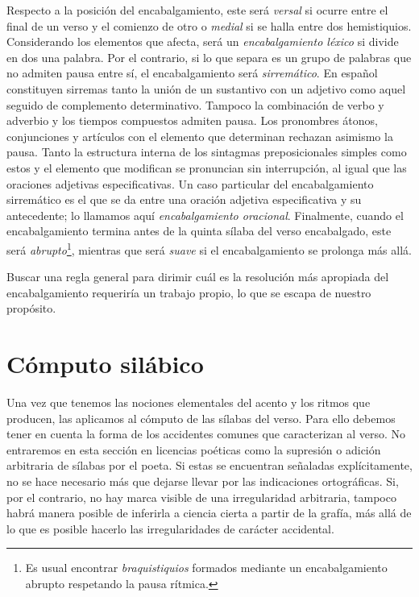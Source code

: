 Respecto a la posición del encabalgamiento, este será \textit{versal} si ocurre entre el final de un verso y el comienzo de otro o \textit{medial} si se halla entre dos hemistiquios. Considerando los elementos que afecta, será un\textit{ encabalgamiento léxico} si divide en dos una palabra. Por el contrario, si lo que separa es un grupo de palabras que no admiten pausa entre sí, el encabalgamiento será \textit{sirremático}. En español constituyen sirremas tanto la unión de un sustantivo con un adjetivo como aquel seguido de complemento determinativo. Tampoco la combinación de verbo y adverbio y los tiempos compuestos admiten pausa. Los pronombres átonos, conjunciones y artículos con el elemento que determinan rechazan asimismo la pausa. Tanto la estructura interna de los sintagmas preposicionales simples como estos y el elemento que modifican se pronuncian sin interrupción, al igual que las  oraciones adjetivas especificativas.  Un caso particular del encabalgamiento sirremático es el que se da entre una oración adjetiva especificativa y su antecedente; lo llamamos aquí \textit{encabalgamiento oracional}. Finalmente, cuando el encabalgamiento termina antes de la quinta sílaba del verso encabalgado, este será \textit{abrupto}\footnote{Es usual encontrar \textit{braquistiquios} formados mediante un encabalgamiento abrupto respetando la pausa rítmica.}, mientras que será \textit{suave} si el encabalgamiento se prolonga más allá.

Buscar una regla general para dirimir cuál es la resolución más apropiada del encabalgamiento requeriría un trabajo propio, lo que se escapa de nuestro propósito.

\section{Cómputo silábico}
Una vez que tenemos las nociones elementales del acento y los ritmos que producen, las aplicamos al cómputo de las sílabas del verso. Para ello debemos tener en cuenta la forma de los accidentes comunes que caracterizan al verso. No entraremos en esta sección en licencias poéticas como la supresión o adición arbitraria de sílabas por el poeta. Si estas se encuentran señaladas explícitamente, no se hace necesario más que dejarse llevar por las indicaciones ortográficas. Si, por el contrario, no hay marca visible de una irregularidad arbitraria, tampoco habrá manera posible de inferirla a ciencia cierta a partir de la grafía, más allá de lo que es posible hacerlo las irregularidades de carácter accidental.

